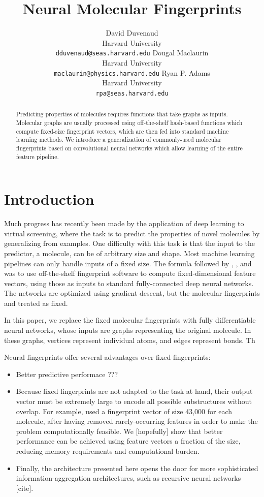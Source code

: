 \documentclass{article}
\title{Neural Molecular Fingerprints}
\author{
David Duvenaud\\
Harvard University\\
\texttt{dduvenaud@seas.harvard.edu}
\And
Dougal Maclaurin\\
Harvard University\\
\texttt{maclaurin@physics.harvard.edu}
\And
Ryan P. Adams\\
Harvard University\\
\texttt{rpa@seas.harvard.edu}
}
\begin{document}
\maketitle

\begin{abstract}
Predicting properties of molecules requires functions that take graphs as inputs.
Molecular graphs are usually processed using off-the-shelf hash-based functions which compute fixed-size fingerprint vectors, which are then fed into standard machine learning methods.
We introduce a generalization of commonly-used molecular fingerprints based on convolutional neural networks which allow learning of the entire feature pipeline.
\end{abstract}

\section{Introduction}

Much progress has recently been made by the application of deep learning to virtual screening, where the task is to predict the properties of novel molecules by generalizing from examples.
One difficulty with this task is that the input to the predictor, a molecule, can be of arbitrary size and shape.
Most machine learning pipelines can only handle inputs of a fixed size.
The formula followed by \cite{unterthinerdeep}, \cite{unterthiner2015toxicity}, and \cite{ramsundar2015massively} was to use off-the-shelf fingerprint software to compute fixed-dimensional feature vectors, using those as inputs to standard fully-connected deep neural networks.
The networks are optimized using gradient descent, but the molecular fingerprints and treated as fixed.

In this paper, we replace the fixed molecular fingerprints with fully differentiable neural networks, whose inputs are graphs representing the original molecule.
In these graphs, vertices represent individual atoms, and edges represent bonds.
Th

Neural fingerprints offer several advantages over fixed fingerprints:
\begin{itemize}
\item Better predictive performace ???
\item Because fixed fingerprints are not adapted to the task at hand, their output vector must be extremely large to encode all possible substructures without overlap.
For example, \cite{unterthinerdeep} used a fingerprint vector of size 43,000 for each molecule, after having removed rarely-occurring features in order to make the problem computationally feasible.
We [hopefully] show that better performance can be achieved using feature vectors a fraction of the size, reducing memory requirements and computational burden.
\item Finally, the architecture presented here opens the door for more sophisticated information-aggregation architectures, such as recursive neural networks [cite].
\end{itemize}
\end{document}
